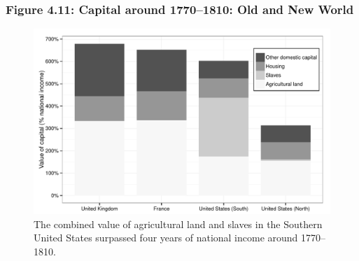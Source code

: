 \documentclass[t]{beamer}\usepackage[]{graphicx}\usepackage[]{color}
\newenvironment{knitrout}{}{} %
\begin{document}
\begin{frame}[label=Figure_4_11]
\frametitle{Figure 4.11: Capital around 1770--1810: Old and New World}
\begin{figure}[t]
\begin{minipage}[b]{\textwidth}
\centering
\begin{knitrout}\footnotesize
{}\color{fgcolor}

{\centering \includegraphics[width=1\linewidth]{figures/bw/Figure_4_11} 

}



\end{knitrout}
\caption{The combined value of agricultural land and slaves in the Southern United States surpassed four years of national income around 1770--1810.}
\end{minipage}
\end{figure}
\end{frame}
\end{document}
